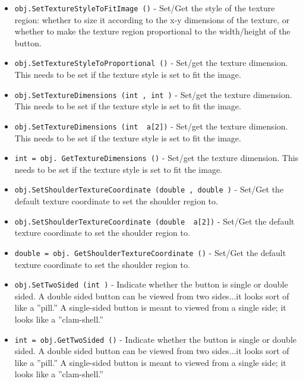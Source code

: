 \begin{itemize}
\item  \verb|obj.SetTextureStyleToFitImage ()| -  Set/Get the style of the texture region: whether to size it
 according to the x-y dimensions of the texture, or whether to make
 the texture region proportional to the width/height of the button.

\item  \verb|obj.SetTextureStyleToProportional ()| -  Set/get the texture dimension. This needs to be set if the texture
 style is set to fit the image.

\item  \verb|obj.SetTextureDimensions (int , int )| -  Set/get the texture dimension. This needs to be set if the texture
 style is set to fit the image.

\item  \verb|obj.SetTextureDimensions (int  a[2])| -  Set/get the texture dimension. This needs to be set if the texture
 style is set to fit the image.

\item  \verb|int = obj. GetTextureDimensions ()| -  Set/get the texture dimension. This needs to be set if the texture
 style is set to fit the image.

\item  \verb|obj.SetShoulderTextureCoordinate (double , double )| -  Set/Get the default texture coordinate to set the shoulder region to.

\item  \verb|obj.SetShoulderTextureCoordinate (double  a[2])| -  Set/Get the default texture coordinate to set the shoulder region to.

\item  \verb|double = obj. GetShoulderTextureCoordinate ()| -  Set/Get the default texture coordinate to set the shoulder region to.

\item  \verb|obj.SetTwoSided (int )| -  Indicate whether the button is single or double sided. A double sided
 button can be viewed from two sides...it looks sort of like a ''pill.''
 A single-sided button is meant to viewed from a single side; it looks 
 like a ''clam-shell.''

\item  \verb|int = obj.GetTwoSided ()| -  Indicate whether the button is single or double sided. A double sided
 button can be viewed from two sides...it looks sort of like a ''pill.''
 A single-sided button is meant to viewed from a single side; it looks 
 like a ''clam-shell.''


\end{itemize}
